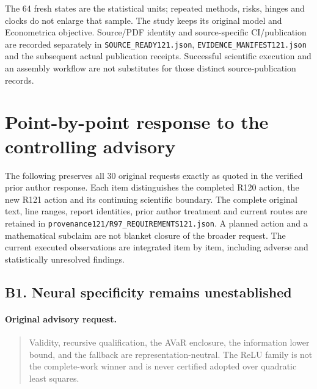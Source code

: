 The 64 fresh states are the statistical units; repeated methods, risks,
hinges and clocks do not enlarge that sample. The study keeps its original
model and Econometrica objective. Source/PDF identity and source-specific
CI/publication are recorded separately in \nolinkurl{SOURCE_READY121.json},
\nolinkurl{EVIDENCE_MANIFEST121.json} and the subsequent actual publication
receipts. Successful scientific execution and an assembly workflow are not
substitutes for those distinct source-publication records.

\section{Point-by-point response to the controlling advisory}
The following preserves all 30 original requests exactly as quoted in the
verified prior author response. Each item distinguishes the completed
R120 action, the new R121 action and its continuing scientific boundary.
The complete original text, line ranges, report identities, prior author
treatment and current routes are retained in
\nolinkurl{provenance121/R97_REQUIREMENTS121.json}. A planned action and
a mathematical subclaim are not blanket closure of the broader request. The current executed observations are integrated item by item, including adverse and statistically unresolved findings.

\subsection{B1. Neural specificity remains unestablished}
\label{response121:B1}

\paragraph{Original advisory request.}
\begin{quote}
Validity, recursive qualification, the AVaR enclosure, the information lower bound, and the fallback are representation-neutral. The ReLU family is not the complete-work winner and is never certified adopted over quadratic least squares.
\end{quote}


